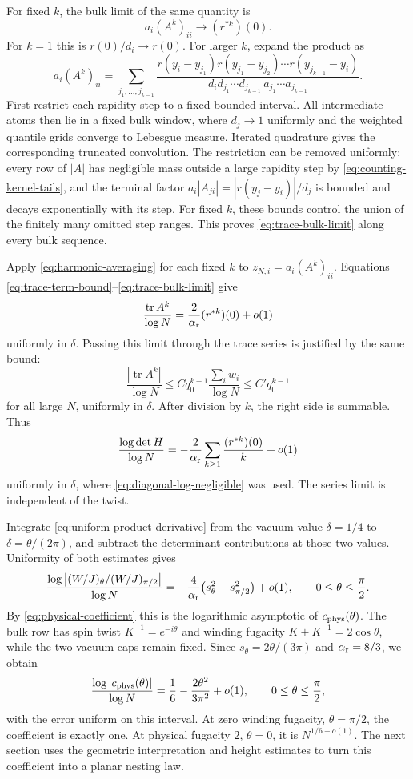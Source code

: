 For fixed \(k\), the bulk limit of the same quantity is
\begin{equation}\label{eq:trace-bulk-limit}
 a_i(A^k)_{ii}\longrightarrow (r^{*k})(0).
\end{equation}
For \(k=1\) this is \(r(0)/d_i\to r(0)\). For larger \(k\), expand the product as
\[
 a_i(A^k)_{ii}
 =\sum_{j_1,\ldots,j_{k-1}}
 \frac{r(y_i-y_{j_1})r(y_{j_1}-y_{j_2})\cdots
       r(y_{j_{k-1}}-y_i)}
 {d_i d_{j_1}\cdots d_{j_{k-1}}\,
  a_{j_1}\cdots a_{j_{k-1}}}.
\]
First restrict each rapidity step to a fixed bounded interval. All intermediate atoms then lie in a fixed bulk window, where \(d_j\to1\) uniformly and the weighted quantile grids converge to Lebesgue measure. Iterated quadrature gives the corresponding truncated convolution. The restriction can be removed uniformly: every row of \(|A|\) has negligible mass outside a large rapidity step by
\eqref{eq:counting-kernel-tails}, and the terminal factor
\(a_i|A_{ji}|=|r(y_j-y_i)|/d_j\) is bounded and decays exponentially with its step. For fixed \(k\), these bounds control the union of the finitely many omitted step ranges. This proves
\eqref{eq:trace-bulk-limit} along every bulk sequence.

Apply \eqref{eq:harmonic-averaging} for each fixed \(k\) to
\(z_{N,i}=a_i(A^k)_{ii}\). Equations
\eqref{eq:trace-term-bound}--\eqref{eq:trace-bulk-limit} give
\[
 \frac{\operatorname{tr}A^k}{\log N}
 =\frac2{\alpha_{\rm r}}(r^{*k})(0)+o(1)
\]
uniformly in \(\delta\). Passing this limit through the trace series is justified by the same bound:
\[
 \frac{|\operatorname{tr}A^k|}{\log N}
 \le Cq_0^{k-1}\frac{\sum_iw_i}{\log N}
 \le C' q_0^{k-1}
\]
for all large \(N\), uniformly in \(\delta\). After division by \(k\), the right side is summable. Thus
\[
 \frac{\log\det H}{\log N}
 =-\frac2{\alpha_{\rm r}}\sum_{k\ge1}\frac{(r^{*k})(0)}k+o(1)
\]
uniformly in \(\delta\), where \eqref{eq:diagonal-log-negligible} was used. The series limit is independent of the twist.

Integrate \eqref{eq:uniform-product-derivative} from the vacuum value
\(\delta=1/4\) to \(\delta=\theta/(2\pi)\), and subtract the determinant contributions at those two values. Uniformity of both estimates gives
\[
 \frac{\log\left|(W/J)_\theta/(W/J)_{\pi/2}\right|}{\log N}
 =-\frac4{\alpha_{\rm r}}
       \bigl(s_\theta^2-s_{\pi/2}^2\bigr)+o(1),
 \qquad 0\le\theta\le\frac\pi2.
\]
By \eqref{eq:physical-coefficient} this is the logarithmic asymptotic of
\(c_{\rm phys}(\theta)\). The bulk row has spin twist
\(K^{-1}=e^{-i\theta}\) and winding fugacity
\(K+K^{-1}=2\cos\theta\), while the two vacuum caps remain fixed. Since
\(s_\theta=2\theta/(3\pi)\) and \(\alpha_{\rm r}=8/3\), we obtain
\begin{equation}\label{eq:amplitude-exponent}
 \frac{\log|c_{\rm phys}(\theta)|}{\log N}
 =\frac16-\frac{2\theta^2}{3\pi^2}+o(1),
 \qquad 0\le\theta\le\frac\pi2,
\end{equation}
with the error uniform on this interval. At zero winding fugacity,
\(\theta=\pi/2\), the coefficient is exactly one. At physical fugacity \(2\), \(\theta=0\), it is \(N^{1/6+o(1)}\). The next section uses the geometric interpretation and height estimates to turn this coefficient into a planar nesting law.

